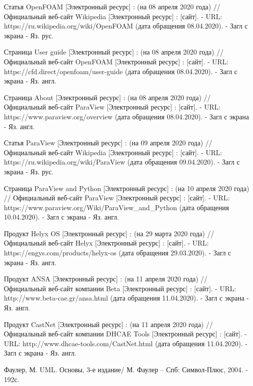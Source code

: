 \documentclass[14pt]{extreport}
\begin{document}
\begin{thebibliography}{9}

   Статья OpenFOAM [Электронный ресурс] : (на 08 апреля 2020 года) // Официальный веб-сайт Wikipedia [Электронный ресурс] : [сайт]. - URL: https://ru.wikipedia.org/wiki/OpenFOAM (дата обращения 08.04.2020). - Загл с экрана - Яз. рус.
   
   Страница User guide [Электронный ресурс] : (на 08 апреля 2020 года) // Официальный веб-сайт OpenFOAM [Электронный ресурс] : [сайт]. - URL: https://cfd.direct/openfoam/user-guide (дата обращения 08.04.2020). - Загл с экрана - Яз. англ.
   
   Страница About [Электронный ресурс] : (на 08 апреля 2020 года) // Официальный веб-сайт ParaView [Электронный ресурс] : [сайт]. - URL: https://www.paraview.org/overview (дата обращения 08.04.2020). - Загл с экрана - Яз. англ.
   
   Статья ParaView [Электронный ресурс] : (на 09 апреля 2020 года) // Официальный веб-сайт Wikipedia [Электронный ресурс] : [сайт]. - URL: https://ru.wikipedia.org/wiki/ParaView (дата обращения 09.04.2020). - Загл с экрана - Яз. рус.
   


   Страница ParaView and Python [Электронный ресурс] : (на 10 апреля 2020 года) // Официальный веб-сайт ParaView [Электронный ресурс] : [сайт]. - URL: https://www.paraview.org/Wiki/ParaView\_and\_Python (дата обращения 10.04.2020). - Загл с экрана - Яз. англ.
  
   Продукт Helyx OS [Электронный ресурс] : (на 29 марта 2020 года) // Официальный веб-сайт Helyx [Электронный ресурс] : [сайт]. - URL: https://engys.com/products/helyx-os (дата обращения 29.03.2020). - Загл с экрана - Яз. англ.
      
   Продукт ANSA [Электронный ресурс] : (на 11 апреля 2020 года) // Официальный веб-сайт компании Beta [Электронный ресурс] : [сайт]. - URL: http://www.beta-cae.gr/ansa.html (дата обращения 11.04.2020). - Загл с экрана - Яз. англ.
   
   Продукт CastNet [Электронный ресурс] : (на 11 апреля 2020 года) // Официальный веб-сайт компании DHCAE Tools [Электронный ресурс] : [сайт]. - URL: http://www.dhcae-tools.com/CastNet.html (дата обращения 11.04.2020). - Загл с экрана - Яз. англ.  

  Фаулер, М. UML. Основы, 3-е издание/ М. Фаулер -- Спб: Символ-Плюс, 2004. - 192с.
  

\end{thebibliography}
\end{document}
